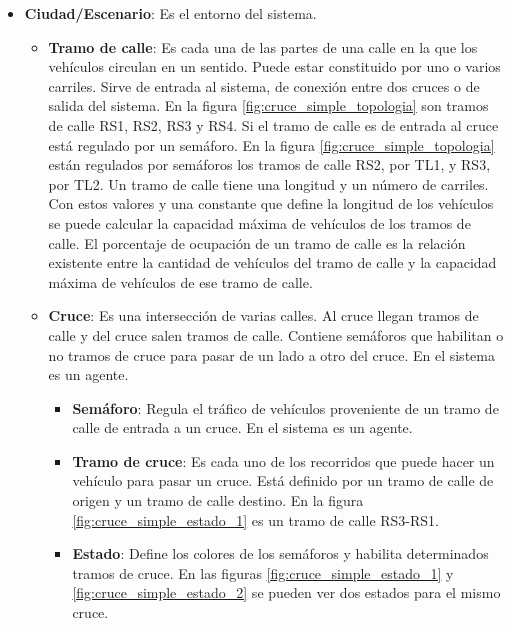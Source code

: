 \begin{itemize}
    \item \textbf{Ciudad/Escenario}: Es el entorno del sistema.
    \begin{itemize}
        \item \textbf{Tramo de calle}: Es cada una de las partes de una calle en la que los vehículos circulan en un sentido. Puede estar constituido por uno o varios carriles. Sirve de entrada al sistema, de conexión entre dos cruces o de salida del sistema. En la figura \ref{fig:cruce_simple_topologia} son tramos de calle RS1, RS2, RS3 y RS4. Si el tramo de calle es de entrada al cruce está regulado por un semáforo. En la figura \ref{fig:cruce_simple_topologia} están regulados por semáforos los tramos de calle RS2, por TL1, y RS3, por TL2. \newline 
        Un tramo de calle tiene una longitud y un número de carriles. Con estos valores y una constante que define la longitud de los vehículos se puede calcular la capacidad máxima de vehículos de los tramos de calle. El porcentaje de ocupación de un tramo de calle es la relación existente entre la cantidad de vehículos del tramo de calle y la capacidad máxima de vehículos de ese tramo de calle.
        \item \textbf{Cruce}: Es una intersección de varias calles. Al cruce llegan tramos de calle y del cruce salen tramos de calle. Contiene semáforos que habilitan o no tramos de cruce para pasar de un lado a otro del cruce. En el sistema es un agente.
        \begin{itemize}
            \item \textbf{Semáforo}: Regula el tráfico de vehículos proveniente de un tramo de calle de entrada a un cruce. En el sistema es un agente.
            \item \textbf{Tramo de cruce}: Es cada uno de los recorridos que puede hacer un vehículo para pasar un cruce. Está definido por un tramo de calle de origen y un tramo de calle destino. En la figura \ref{fig:cruce_simple_estado_1} es un tramo de calle RS3-RS1.
            \item \textbf{Estado}: Define los colores de los semáforos y habilita determinados tramos de cruce. En las figuras \ref{fig:cruce_simple_estado_1} y \ref{fig:cruce_simple_estado_2} se pueden ver dos estados para el mismo cruce. 
        \end{itemize}
    \end{itemize}
\end{itemize}

